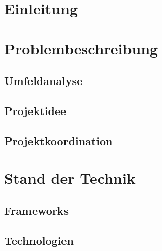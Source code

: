 \documentclass[12pt]{article}
\begin{document}
\ofoot{\pagemark}

\section{Einleitung}
\label{sec:einleitung}


\section{Problembeschreibung}
\label{sec:problembeschreibung}

\subsection{Umfeldanalyse}
\label{subsec:umfeldanalyse}


\newpage

\subsection{Projektidee}
\label{subsec:projektidee}


\subsection{Projektkoordination}
\label{subsec:projektkoordination}


\newpage

\section{Stand der Technik}
\label{sec:standdertechnik}

\subsection{Frameworks}
\label{subsec:frameworks}


\newpage

\subsection{Technologien}
\label{subsec:technologien}


\newpage %
\end{document}
